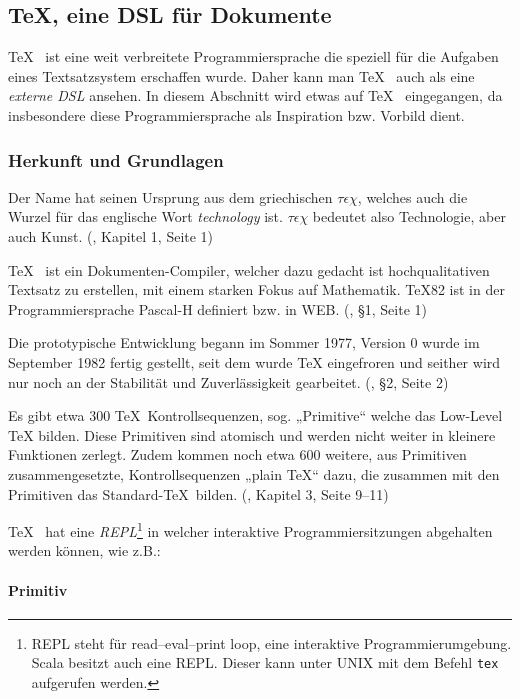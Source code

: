\subsection{\TeX, eine DSL für Dokumente}

\TeX~ ist eine weit verbreitete Programmiersprache die speziell für die
Aufgaben eines Textsatzsystem erschaffen wurde. Daher kann man
\TeX~ auch als eine \emph{externe DSL} ansehen.
In diesem Abschnitt wird etwas auf
\TeX~ eingegangen, da insbesondere diese Programmiersprache als Inspiration
bzw. Vorbild dient.


\subsubsection{Herkunft und Grundlagen}

Der Name hat seinen Ursprung aus dem griechischen $\tau\epsilon\chi$,
welches auch die Wurzel für das englische Wort \emph{technology} ist.
$\tau\epsilon\chi$ bedeutet also Technologie, aber auch Kunst.
(\cite{tex-a}, Kapitel 1, Seite 1)

\TeX~ ist ein Dokumenten-Compiler, welcher dazu gedacht ist hochqualitativen
Textsatz zu erstellen, mit einem starken Fokus auf
Mathematik. \TeX82 ist in der Programmiersprache Pascal-H definiert
bzw. in WEB. (\cite{tex-b}, §1, Seite 1)

Die prototypische Entwicklung begann im Sommer 1977, Version 0 wurde
im September 1982 fertig gestellt, seit dem wurde TeX eingefroren
und seither wird nur noch an der Stabilität und Zuverlässigkeit
gearbeitet. (\cite{tex-b}, §2, Seite 2)

Es gibt etwa 300 \TeX~Kontrollsequenzen, sog. „Primitive“ welche das
Low-Level TeX bilden. Diese Primitiven sind atomisch und werden nicht weiter
in kleinere Funktionen zerlegt.
Zudem kommen noch etwa 600 weitere, aus Primitiven zusammengesetzte,
Kontrollsequenzen „plain \TeX“ dazu,
die zusammen mit den Primitiven das Standard-\TeX~bilden.
(\cite{tex-a}, Kapitel 3, Seite 9--11)

\TeX~ hat eine \emph{REPL}\footnote{REPL steht für read–eval–print loop,
eine interaktive Programmierumgebung. Scala besitzt auch eine REPL.
Dieser kann unter UNIX mit dem Befehl \lstinline|tex| aufgerufen werden.}
in welcher interaktive Programmiersitzungen abgehalten werden können,
wie z.B.:

\paragraph{Primitiv}

